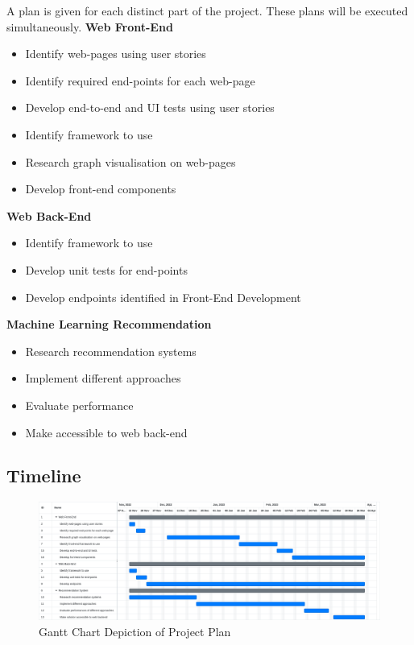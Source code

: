 A plan is given for each distinct part of the project. These plans will be executed simultaneously.
\textbf{Web Front-End}
\begin{itemize}
    \item Identify web-pages using user stories
    \item Identify required end-points for each web-page
    \item Develop end-to-end and UI tests using user stories 
    \item Identify framework to use
    \item Research graph visualisation on web-pages
    \item Develop front-end components
\end{itemize}
\textbf{Web Back-End}
\begin{itemize}
    \item Identify framework to use
    \item Develop unit tests for end-points
    \item Develop endpoints identified in Front-End Development
\end{itemize}
\textbf{Machine Learning Recommendation}
\begin{itemize}
    \item Research recommendation systems
    \item Implement different approaches
    \item Evaluate performance
    \item Make accessible to web back-end
\end{itemize}

\subsection{Timeline}


\begin{figure}[htbp]	
	\centerline{
		\includegraphics[width=16.1cm]{../PlanGantt.png}
	}
	\caption{Gantt Chart Depiction of Project Plan}
\end{figure}



